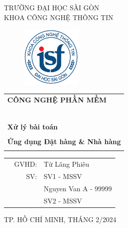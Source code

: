 \documentclass[a4paper]{article}
\begin{document}
\begin{titlepage}
\begin{center}
TRƯỜNG ĐẠI HỌC SÀI GÒN \\
KHOA CÔNG NGHỆ THÔNG TIN
\end{center}
\vspace{1cm}

\begin{figure}[h!]
\begin{center}
\includegraphics[width=3cm]{logoITSGU.png}
\end{center}
\end{figure}

\vspace{1cm}


\begin{center}
\begin{tabular}{c}
	\multicolumn{1}{l}{\textbf{{\Large CÔNG NGHỆ PHẦN MỀM}}}\\
	~~\\
	\hline
	\\
	\multicolumn{1}{l}{\textbf{{\Large Xử lý bài toán }}}\\
	\\
	
	\textbf{{\Huge Ứng dụng Đặt hàng \& Nhà hàng}}\\
	\\
	\hline
\end{tabular}
\end{center}

\vspace{3cm}

\begin{table}[h]
\begin{tabular}{rrl}
\hspace{5 cm} & GVHD: &Từ Lãng Phiêu\\
& SV: & SV1 - MSSV\\
& & Nguyen Van A - 99999 \\
& & SV2 - MSSV \\
\end{tabular}
\vspace{1.5 cm}
\end{table}

\begin{center}

{\footnotesize TP. HỒ CHÍ MINH, THÁNG 2/2024}
\end{center}
\end{titlepage}
\end{document}

